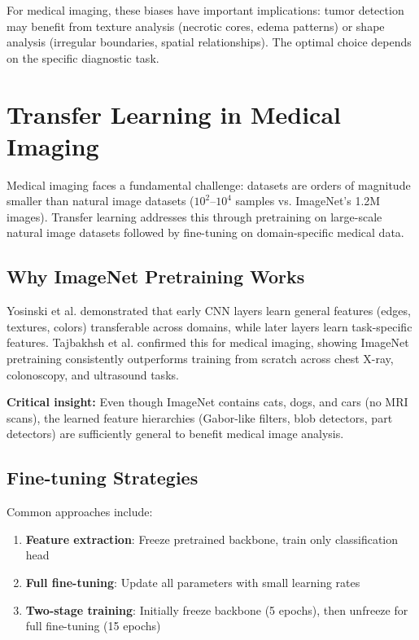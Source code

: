For medical imaging, these biases have important implications: tumor detection may benefit from texture analysis (necrotic cores, edema patterns) or shape analysis (irregular boundaries, spatial relationships). The optimal choice depends on the specific diagnostic task.

\section{Transfer Learning in Medical Imaging}

Medical imaging faces a fundamental challenge: datasets are orders of magnitude smaller than natural image datasets ($10^2$--$10^4$ samples vs. ImageNet's 1.2M images). Transfer learning addresses this through pretraining on large-scale natural image datasets followed by fine-tuning on domain-specific medical data.

\subsection{Why ImageNet Pretraining Works}

Yosinski et al. \cite{yosinski2014transferable} demonstrated that early CNN layers learn general features (edges, textures, colors) transferable across domains, while later layers learn task-specific features. Tajbakhsh et al. \cite{tajbakhsh2016convolutional} confirmed this for medical imaging, showing ImageNet pretraining consistently outperforms training from scratch across chest X-ray, colonoscopy, and ultrasound tasks.

\textbf{Critical insight:} Even though ImageNet contains cats, dogs, and cars (no MRI scans), the learned feature hierarchies (Gabor-like filters, blob detectors, part detectors) are sufficiently general to benefit medical image analysis.

\subsection{Fine-tuning Strategies}

Common approaches include:

\begin{enumerate}
    \item \textbf{Feature extraction}: Freeze pretrained backbone, train only classification head
    \item \textbf{Full fine-tuning}: Update all parameters with small learning rates
    \item \textbf{Two-stage training}: Initially freeze backbone (5 epochs), then unfreeze for full fine-tuning (15 epochs)
\end{enumerate}

